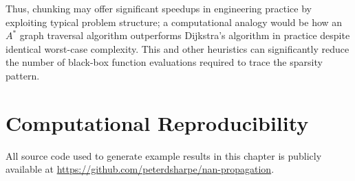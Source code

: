 Thus, chunking may offer significant speedups in engineering practice by exploiting typical problem structure; a computational analogy would be how an $A^*$ graph traversal algorithm outperforms Dijkstra's algorithm in practice despite identical worst-case complexity. This and other heuristics can significantly reduce the number of black-box function evaluations required to trace the sparsity pattern.


\section{Computational Reproducibility}
\label{sec:nan-reproducibility}

All source code used to generate example results in this chapter is publicly available at \url{https://github.com/peterdsharpe/nan-propagation}.
